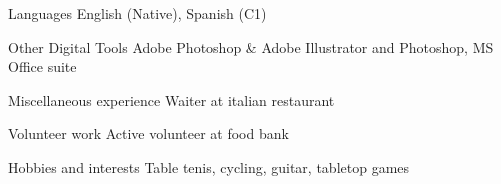 \iftrue%
\miscSkillRow%
        {Languages}%
        {%
        English (Native), Spanish (C1)%
        }%
\myhline%
\fi
\iftrue%
\miscSkillRow%
        {Other Digital Tools}%
        {%
        Adobe Photoshop \& Adobe Illustrator and Photoshop, MS Office suite%
        }%
\myhline%
\fi
\iftrue%
\miscSkillRow%
        {Miscellaneous experience}%
        {%
        Waiter at italian restaurant%
        }%
\myhline%
\fi
\iftrue%
\miscSkillRow%
        {Volunteer work}%
        {%
        Active volunteer at food bank%
        }%
\myhline%
\fi
\iftrue%
\miscSkillRow%
        {Hobbies and interests}%
        {%
        Table tenis, cycling, guitar, tabletop games%
        }%
\myhline%
\fi
